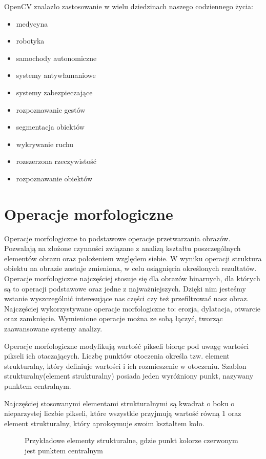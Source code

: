 \documentclass[a4paper,12pt,twoside,openany]{report}
\newcommand{\ImgPath}{.}
\begin{document}
OpenCV znalazło zastosowanie w wielu dziedzinach naszego codziennego życia:
\begin{itemize} 
	\item medycyna
	\item robotyka
	\item samochody autonomiczne
	\item systemy antywłamaniowe 
	\item systemy zabezpieczające
	\item rozpoznawanie gestów
	\item segmentacja obiektów
	\item wykrywanie ruchu
	\item rozszerzona rzeczywistość
	\item rozpoznawanie obiektów
\end{itemize}


\section{Operacje morfologiczne}
Operacje morfologiczne to podstawowe operacje przetwarzania obrazów. Pozwalają na złożone czynności związane z analizą kształtu poszczególnych elementów obrazu oraz położeniem względem siebie. W wyniku operacji struktura obiektu na obrazie zostaje zmieniona, w celu osiągnięcia określonych rezultatów. 
Operacje morfologiczne najczęściej stosuje się dla obrazów binarnych, dla których są to operacji podstawowe oraz jedne z najważniejszych. Dzięki nim jesteśmy wstanie wyszczególnić interesujące nas części czy też przefiltrować nasz obraz. Najczęściej wykorzystywane operacje morfologiczne to: erozja, dylatacja, otwarcie oraz zamknięcie. Wymienione operacje można ze sobą łączyć, tworząc zaawansowane systemy analizy.

Operacje morfologiczne modyfikują wartość pikseli biorąc pod uwagę wartości pikseli ich otaczających. Liczbę punktów otoczenia określa tzw. element strukturalny, który definiuje wartości i ich rozmieszenie w otoczeniu. Szablon strukturalny(element strukturalny) posiada jeden wyróżniony punkt, nazywany punktem centralnym.

Najczęściej stosowanymi elementami strukturalnymi są kwadrat o boku o nieparzystej liczbie pikseli, które wszystkie przyjmują wartość równą 1 oraz element strukturalny, który aproksymuje swoim kształtem koło.

\begin{figure}[H]
	\centering
	\caption{Przykładowe elementy strukturalne, gdzie punkt kolorze czerwonym jest punktem centralnym}
\end{figure}
\end{document}
